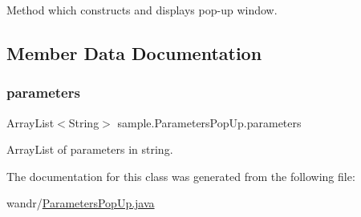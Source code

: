 Method which constructs and displays pop-\/up window. 

\subsection{Member Data Documentation}
\mbox{\label{classsample_1_1_parameters_pop_up_a2548fa7434a4183e0ecb9df1f68c4158}} 
\subsubsection{\texorpdfstring{parameters}{parameters}}
{\footnotesize\ttfamily Array\+List$<$String$>$ sample.\+Parameters\+Pop\+Up.\+parameters}

Array\+List of parameters in string. 

The documentation for this class was generated from the following file\+:\begin{DoxyCompactItemize}
\item 
wandr/\hyperlink{_parameters_pop_up_8java}{Parameters\+Pop\+Up.\+java}\end{DoxyCompactItemize}
